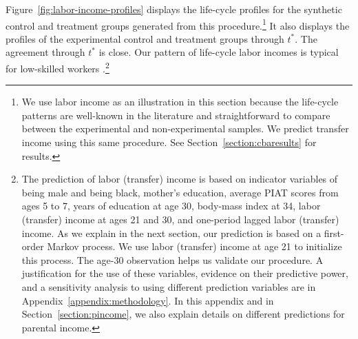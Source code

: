 Figure~\ref{fig:labor-income-profiles} displays the life-cycle profiles for the synthetic control and treatment groups generated from this procedure.\footnote{We use labor income as an illustration in this section because the life-cycle patterns are well-known in the literature and straightforward to compare between the experimental and non-experimental samples. We predict transfer income using this same procedure. See Section~\ref{section:cbaresults} for results.} It also displays the profiles of the experimental control and treatment groups through $t^*$. The agreement through $t^*$ is close. Our pattern of life-cycle labor incomes is typical for low-skilled workers \citep{Blundell-etal_2015_J-Pub-E,Gladden_Taber_2000_WageProgression,Sanders-Taber_2012_AR,Lagakos_Moll_etal_2016_LifeCycle_NBER}.\footnote{The prediction of labor (transfer) income is based on indicator variables of being male and being black, mother's education, average PIAT scores from ages 5 to 7, years of education at age 30, body-mass index at 34, labor (transfer) income at ages 21 and 30, and one-period lagged labor (transfer) income. As we explain in the next section, our prediction is based on a first-order Markov process. We use labor (transfer) income at age 21 to initialize this process. The age-30 observation helps us validate our procedure. A justification for the use of these variables, evidence on their predictive power, and a sensitivity analysis to using different prediction variables are in Appendix~\ref{appendix:methodology}. In this appendix and in Section~\ref{section:pincome}, we also explain details on different predictions for parental income.} 

